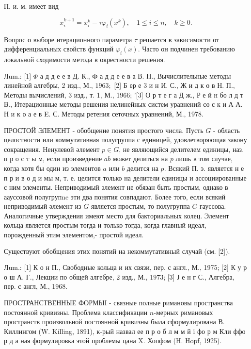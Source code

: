 \documentclass[10pt]{article}
\begin{document}
П. и. м. имеет вид



\[

x_{i}^{k+1}=x_{i}^{k}-\tau \varphi_{i}\left(x^{k}\right), \quad 1 \leqslant i \leqslant n, \quad k \geqslant 0 .

\]



Вопрос о выборе итерационного параметра $\tau$ решается в зависимости от дифференциальных свойств функций $\varphi_{i}(x)$. Часто он подчинен требованию локальной сходимости метода в окрестности решения.



Лum.: [1] $\Phi$ а д д е е в Д. К., Ф а д д е е в а В. Н., Вычислительные методы линейной алгебры, 2 изд., М., $1963 ;$ [2] Б ер е 3 и н И. С., Ж и д к о в Н. П., Методы вычислений, 3 изд., т. 1, М., 1966; '[3] О р т е г а Д ж., Р е й н бо л д т В., Итерационные методы решения нелинейных систем уравнений со с к и А А. Н и к о а е в E. С. Методы ретения сеточных уравнений, М., 1978.



ПРОСТОЙ ЭЛЕМЕНТ - обобщение понятия простого числа. Пусть $G$ - область целостности или коммутативная полугруппа с единицей, удовлетворяющая закону сокращения. Ненулевой әлемент $p \in G$, не являющийся делителем единицы, наз. п р о с т ы м, если произведение $a b$ может делиться на $p$ лишь в том случае, когда хотя бы один из элементов $a$ или $b$ делится на $p$. Всякий П. э. является н е п р и в о д и мы м, т. е. целится только на делители единицы и ассоциированные с ним элементы. Неприводимый элемент не обязан быть простым, однако в аауссовой полугрупne эти два понятия совпадают. Более того, если всякий неприводимый әлемент из $G$ является простым, то полугруппа $G$ гауссова. Аналогичные утверждения имеют место для бакториальных колец. Элемент кольца является простым тогда и только тогда, когда главный идеал, порожденный этим элементом,- простой идеал.



Существуют обобщения этих понятий на некоммутативный случай (см. [2]).



Лum.: [1] К о н П., Свободные кольца и их связи, пер. с англ., М., 1975; [2] К у р о ш А. Г., Лекции по общей алгебре, 2 изд., М., 1973; [3] Ј е н г С., Алгебра, пер. с англ, М., 1968.



ПРОСТРАНСТВЕННЫЕ ФОРМЫІ - связные полные римановы пространства постоянной кривизны. Проблема классификации $n$-мерных римановых пространств произвольной постоянной кривизны была сформулиpована В. Киллингом (W. Killing, 1891), к-рый назвал ее п р о б л м м й і фо р м Кли ффо р д а ная формулировка этой проблемы цана X. Хопфом (H. Hopf, 1925).
\end{document}
